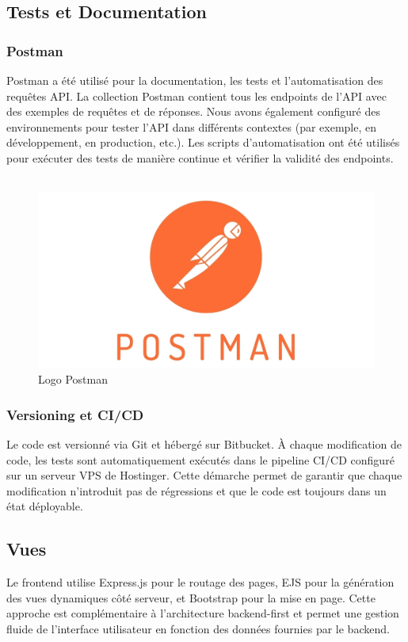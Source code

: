 {\subsection*{Tests et Documentation}
\subsubsection*{Postman}
Postman a été utilisé pour la documentation, les tests et l’automatisation des requêtes API. La collection Postman contient tous les endpoints de l'API avec des exemples de requêtes et de réponses. Nous avons également configuré des environnements pour tester l’API dans différents contextes (par exemple, en développement, en production, etc.). Les scripts d’automatisation ont été utilisés pour exécuter des tests de manière continue et vérifier la validité des endpoints. \\\\

\begin{figure}[H]
\begin{center}
\includegraphics[width=15cm]{assets/presentation/postman-logo-vert-2018.jpg}
\end{center}
\caption{Logo Postman}
\end{figure}


\subsubsection*{Versioning et CI/CD}
Le code est versionné via Git et hébergé sur Bitbucket. À chaque modification de code, les tests sont automatiquement exécutés dans le pipeline CI/CD configuré sur un serveur VPS de Hostinger. Cette démarche permet de garantir que chaque modification n'introduit pas de régressions et que le code est toujours dans un état déployable.

\subsection*{Vues}
Le frontend utilise Express.js pour le routage des pages, EJS pour la génération des vues dynamiques côté serveur, et Bootstrap pour la mise en page. Cette approche est complémentaire à l'architecture backend-first et permet une gestion fluide de l'interface utilisateur en fonction des données fournies par le backend.

}
